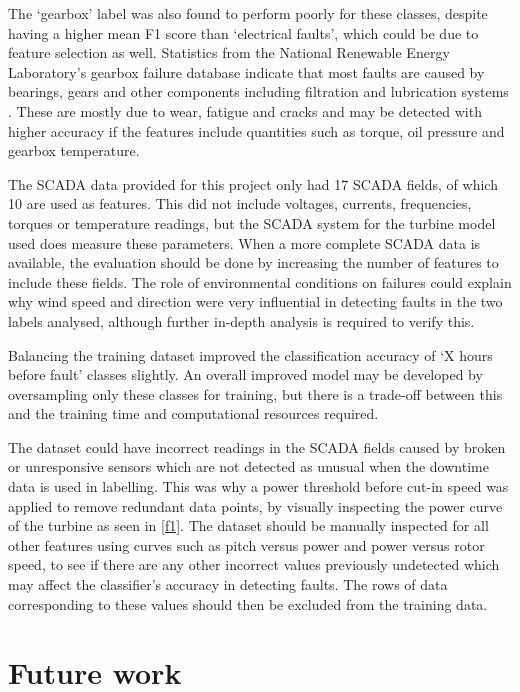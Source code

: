 The `gearbox' label was also found to perform poorly for these classes,
despite having a higher mean F1 score than `electrical faults', which could be
due to feature selection as well. Statistics from the National Renewable
Energy Laboratory's gearbox failure database indicate that most faults are
caused by bearings, gears and other components including filtration and
lubrication systems \cite{Stati15}. These are mostly due to wear, fatigue and
cracks \cite{Sheng11} and may be detected with higher accuracy if the features
include quantities such as torque, oil pressure and gearbox temperature.

The SCADA data provided for this project only had 17 SCADA fields, of which 10
are used as features. This did not include voltages, currents, frequencies,
torques or temperature readings, but the SCADA system for the turbine model
used does measure these parameters. When a more complete SCADA data is
available, the evaluation should be done by increasing the number of features
to include these fields. The role of environmental conditions on failures
could explain why wind speed and direction were very influential in detecting
faults in the two labels analysed, although further in-depth analysis is
required to verify this.

Balancing the training dataset improved the classification accuracy of `X
hours before fault' classes slightly. An overall improved model may be
developed by oversampling only these classes for training, but there is a
trade-off between this and the training time and computational resources
required.

The dataset could have incorrect readings in the SCADA fields caused by broken
or unresponsive sensors which are not detected as unusual when the downtime
data is used in labelling. This was why a power threshold before cut-in speed
was applied to remove redundant data points, by visually inspecting the power
curve of the turbine as seen in \autoref{f1}. The dataset should be manually
inspected for all other features using curves such as pitch versus power and
power versus rotor speed, to see if there are any other incorrect values
previously undetected which may affect the classifier's accuracy in detecting
faults. The rows of data corresponding to these values should then be excluded
from the training data.

\section{Future work}

